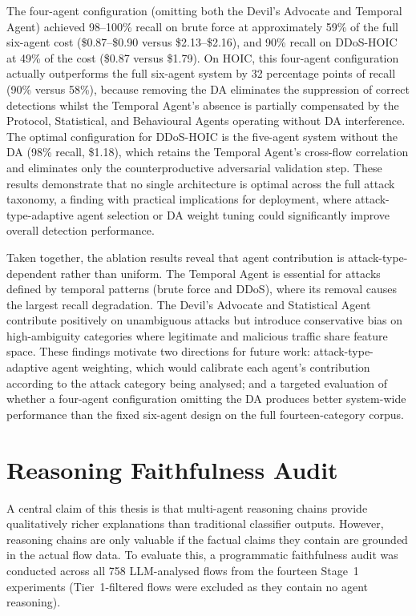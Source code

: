\documentclass[../main.tex]{subfiles}
\begin{document}
The four-agent configuration (omitting both the Devil's Advocate and Temporal Agent) achieved 98--100\% recall on brute force at approximately 59\% of the full six-agent cost (\$0.87--\$0.90 versus \$2.13--\$2.16), and 90\% recall on DDoS-HOIC at 49\% of the cost (\$0.87 versus \$1.79). On HOIC, this four-agent configuration actually outperforms the full six-agent system by 32 percentage points of recall (90\% versus 58\%), because removing the DA eliminates the suppression of correct detections whilst the Temporal Agent's absence is partially compensated by the Protocol, Statistical, and Behavioural Agents operating without DA interference. The optimal configuration for DDoS-HOIC is the five-agent system without the DA (98\% recall, \$1.18), which retains the Temporal Agent's cross-flow correlation and eliminates only the counterproductive adversarial validation step. These results demonstrate that no single architecture is optimal across the full attack taxonomy, a finding with practical implications for deployment, where attack-type-adaptive agent selection or DA weight tuning could significantly improve overall detection performance.

Taken together, the ablation results reveal that agent contribution is attack-type-dependent rather than uniform. The Temporal Agent is essential for attacks defined by temporal patterns (brute force and DDoS), where its removal causes the largest recall degradation. The Devil's Advocate and Statistical Agent contribute positively on unambiguous attacks but introduce conservative bias on high-ambiguity categories where legitimate and malicious traffic share feature space. These findings motivate two directions for future work: attack-type-adaptive agent weighting, which would calibrate each agent's contribution according to the attack category being analysed; and a targeted evaluation of whether a four-agent configuration omitting the DA produces better system-wide performance than the fixed six-agent design on the full fourteen-category corpus.

\section{Reasoning Faithfulness Audit}
\label{sec:faithfulness-audit}

A central claim of this thesis is that multi-agent reasoning chains provide qualitatively richer explanations than traditional classifier outputs. However, reasoning chains are only valuable if the factual claims they contain are grounded in the actual flow data. To evaluate this, a programmatic faithfulness audit was conducted across all 758 LLM-analysed flows from the fourteen Stage~1 experiments (Tier~1-filtered flows were excluded as they contain no agent reasoning).
\end{document}
